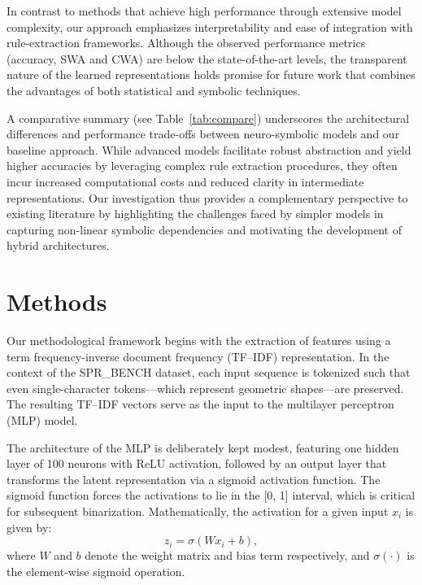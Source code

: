 \documentclass{article}
\begin{document}
In contrast to methods that achieve high performance through extensive model complexity, our approach emphasizes interpretability and ease of integration with rule-extraction frameworks. Although the observed performance metrics (accuracy, SWA and CWA) are below the state-of-the-art levels, the transparent nature of the learned representations holds promise for future work that combines the advantages of both statistical and symbolic techniques.

A comparative summary (see Table~\ref{tab:compare}) underscores the architectural differences and performance trade-offs between neuro-symbolic models and our baseline approach. While advanced models facilitate robust abstraction and yield higher accuracies by leveraging complex rule extraction procedures, they often incur increased computational costs and reduced clarity in intermediate representations. Our investigation thus provides a complementary perspective to existing literature by highlighting the challenges faced by simpler models in capturing non-linear symbolic dependencies and motivating the development of hybrid architectures.

\section{Methods}
Our methodological framework begins with the extraction of features using a term frequency-inverse document frequency (TF–IDF) representation. In the context of the SPR\_BENCH dataset, each input sequence is tokenized such that even single-character tokens—which represent geometric shapes—are preserved. The resulting TF–IDF vectors serve as the input to the multilayer perceptron (MLP) model.

The architecture of the MLP is deliberately kept modest, featuring one hidden layer of 100 neurons with ReLU activation, followed by an output layer that transforms the latent representation via a sigmoid activation function. The sigmoid function forces the activations to lie in the [0, 1] interval, which is critical for subsequent binarization. Mathematically, the activation for a given input \(x_i\) is given by:
\[
z_i = \sigma(W x_i + b),
\]
where \(W\) and \(b\) denote the weight matrix and bias term respectively, and \(\sigma(\cdot)\) is the element-wise sigmoid operation.
\end{document}
